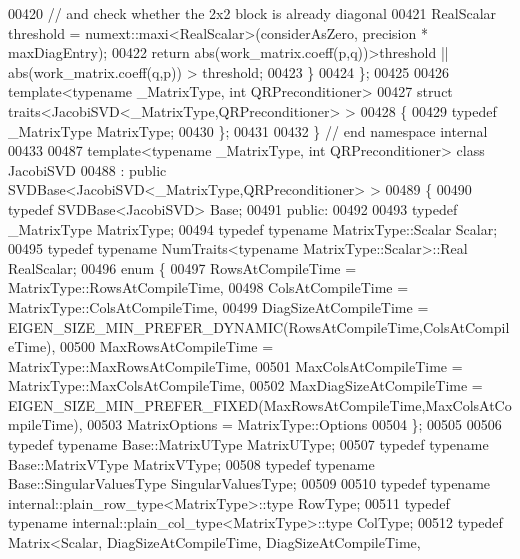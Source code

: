 \begin{DoxyCode}
00420     \textcolor{comment}{// and check whether the 2x2 block is already diagonal}
00421     RealScalar threshold = numext::maxi<RealScalar>(considerAsZero, precision * maxDiagEntry);
00422     \textcolor{keywordflow}{return} abs(work\_matrix.coeff(p,q))>threshold || abs(work\_matrix.coeff(q,p)) > threshold;
00423   \}
00424 \};
00425 
00426 \textcolor{keyword}{template}<\textcolor{keyword}{typename} \_MatrixType, \textcolor{keywordtype}{int} QRPreconditioner> 
00427 \textcolor{keyword}{struct }traits<JacobiSVD<\_MatrixType,QRPreconditioner> >
00428 \{
00429   \textcolor{keyword}{typedef} \_MatrixType MatrixType;
00430 \};
00431 
00432 \} \textcolor{comment}{// end namespace internal}
00433 
00487 \textcolor{keyword}{template}<\textcolor{keyword}{typename} \_MatrixType, \textcolor{keywordtype}{int} QRPreconditioner> \textcolor{keyword}{class }JacobiSVD
00488  : \textcolor{keyword}{public} SVDBase<JacobiSVD<\_MatrixType,QRPreconditioner> >
00489 \{
00490     \textcolor{keyword}{typedef} SVDBase<JacobiSVD> Base;
00491   \textcolor{keyword}{public}:
00492 
00493     \textcolor{keyword}{typedef} \_MatrixType MatrixType;
00494     \textcolor{keyword}{typedef} \textcolor{keyword}{typename} MatrixType::Scalar Scalar;
00495     \textcolor{keyword}{typedef} \textcolor{keyword}{typename} NumTraits<typename MatrixType::Scalar>::Real RealScalar;
00496     \textcolor{keyword}{enum} \{
00497       RowsAtCompileTime = MatrixType::RowsAtCompileTime,
00498       ColsAtCompileTime = MatrixType::ColsAtCompileTime,
00499       DiagSizeAtCompileTime = EIGEN\_SIZE\_MIN\_PREFER\_DYNAMIC(RowsAtCompileTime,ColsAtCompileTime),
00500       MaxRowsAtCompileTime = MatrixType::MaxRowsAtCompileTime,
00501       MaxColsAtCompileTime = MatrixType::MaxColsAtCompileTime,
00502       MaxDiagSizeAtCompileTime = EIGEN\_SIZE\_MIN\_PREFER\_FIXED(MaxRowsAtCompileTime,MaxColsAtCompileTime),
00503       MatrixOptions = MatrixType::Options
00504     \};
00505 
00506     \textcolor{keyword}{typedef} \textcolor{keyword}{typename} Base::MatrixUType MatrixUType;
00507     \textcolor{keyword}{typedef} \textcolor{keyword}{typename} Base::MatrixVType MatrixVType;
00508     \textcolor{keyword}{typedef} \textcolor{keyword}{typename} Base::SingularValuesType SingularValuesType;
00509     
00510     \textcolor{keyword}{typedef} \textcolor{keyword}{typename} internal::plain\_row\_type<MatrixType>::type RowType;
00511     \textcolor{keyword}{typedef} \textcolor{keyword}{typename} internal::plain\_col\_type<MatrixType>::type ColType;
00512     \textcolor{keyword}{typedef} Matrix<Scalar, DiagSizeAtCompileTime, DiagSizeAtCompileTime,

\end{DoxyCode}
